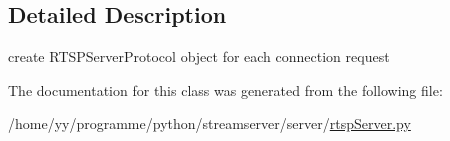 \subsection{Detailed Description}
\begin{DoxyVerb}create RTSPServerProtocol object for each connection request\end{DoxyVerb}
 

The documentation for this class was generated from the following file:\begin{DoxyCompactItemize}
\item 
/home/yy/programme/python/streamserver/server/\hyperlink{rtspServer_8py}{rtspServer.py}\end{DoxyCompactItemize}
